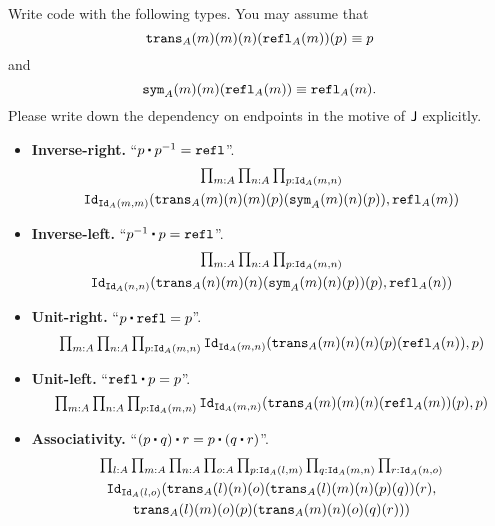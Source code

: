\documentclass[12pt]{article}
\begin{document}
\begin{task}
  Write code with the following types.
  You may assume that
  \[
    \mathtt{trans}_A(m)(m)(n)(\mathtt{refl}_A(m))(p) \equiv p
  \]
  and
  \[
    \mathtt{sym}_A(m)(m)(\mathtt{refl}_A(m)) \equiv \mathtt{refl}_A(m).
  \]
  Please write down the dependency on endpoints in the motive of $\mathsf{J}$ explicitly.
  \begin{itemize}
    \item
      \textbf{Inverse-right.}
      ``$p \concat p^{-1} = \refl$''.
      \begin{multline*}
        \textstyle
        \prod_{m{:}A}\prod_{n{:}A}\prod_{p{:}\mathtt{Id}_A(m,n)}\\
          \mathtt{Id}_{\mathtt{Id}_A(m,m)}(\mathtt{trans}_A(m)(n)(m)(p)(\mathtt{sym}_A(m)(n)(p)), \mathtt{refl}_A(m))
      \end{multline*}
    \item
      \textbf{Inverse-left.}
      ``$p^{-1} \concat p = \refl$''.
      \begin{multline*}
        \textstyle
        \prod_{m{:}A}\prod_{n{:}A}\prod_{p{:}\mathtt{Id}_A(m,n)}\\
        \mathtt{Id}_{\mathtt{Id}_A(n,n)}(\mathtt{trans}_A(n)(m)(n)(\mathtt{sym}_A(m)(n)(p))(p), \mathtt{refl}_A(n))
      \end{multline*}
    \item
      \textbf{Unit-right.}
      ``$p \concat \refl = p$''.
      \begin{multline*}
        \textstyle
        \prod_{m{:}A}\prod_{n{:}A}\prod_{p{:}\mathtt{Id}_A(m,n)}\mathtt{Id}_{\mathtt{Id}_A(m,n)}(\mathtt{trans}_A(m)(n)(n)(p)(\mathtt{refl}_A(n)), p)
      \end{multline*}

    \item
      \textbf{Unit-left.}
      ``$\refl \concat p = p$''.
      \[
        \textstyle
        \prod_{m{:}A}\prod_{n{:}A}\prod_{p{:}\mathtt{Id}_A(m,n)}\mathtt{Id}_{\mathtt{Id}_A(m,n)}(\mathtt{trans}_A(m)(m)(n)(\mathtt{refl}_A(m))(p), p)
      \]

    \item
      \textbf{Associativity.}
      ``$(p \concat q) \concat r = p \concat (q \concat r)$''.
      \begin{multline*}
        \textstyle
        \prod_{l{:}A}\prod_{m{:}A}\prod_{n{:}A}\prod_{o{:}A}\prod_{p{:}\mathtt{Id}_A(l,m)}\prod_{q{:}\mathtt{Id}_A(m,n)}\prod_{r{:}\mathtt{Id}_A(n,o)}
        \\
        \mathtt{Id}_{\mathtt{Id}_A(l,o)}(\mathtt{trans}_A(l)(n)(o)(\mathtt{trans}_A(l)(m)(n)(p)(q))(r),
        \\
        \mathtt{trans}_A(l)(m)(o)(p)(\mathtt{trans}_A(m)(n)(o)(q)(r)))
      \end{multline*}
  \end{itemize}
\end{task}
\end{document}
